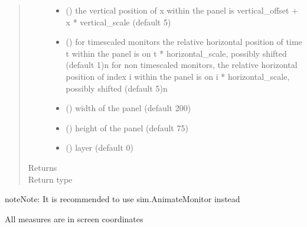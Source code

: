 \documentclass[letterpaper,10pt,english]{sphinxmanual}
\begin{document}
\begin{fulllineitems}
\begin{fulllineitems}
\begin{quote}
\begin{description}
\begin{itemize}
\begin{description}
\end{description}


\item {} 
 () \textendash{} the vertical position of x within the panel is
vertical\_offset + x * vertical\_scale (default 5)

\item {} 
 () \textendash{} for timescaled monitors the relative horizontal position of time t within the panel is on
t * horizontal\_scale, possibly shifted (default 1)\textbar{}n\textbar{}
for non timescaled monitors, the relative horizontal position of index i within the panel is on
i * horizontal\_scale, possibly shifted (default 5)\textbar{}n\textbar{}

\item {} 
 () \textendash{} width of the panel (default 200)

\item {} 
 () \textendash{} height of the panel (default 75)

\item {} 
 () \textendash{} layer (default 0)

\end{itemize}

\item[{Returns}] \leavevmode
{}

\item[{Return type}] \leavevmode
{\hyperref[\detokenize{Reference:salabim.AnimateMonitor}]{}}

\end{description}\end{quote}

\begin{sphinxadmonition}{note}{Note:}
It is recommended to use sim.AnimateMonitor instead 

All measures are in screen coordinates 
\end{sphinxadmonition}

\end{fulllineitems}


\end{fulllineitems}
\end{document}
